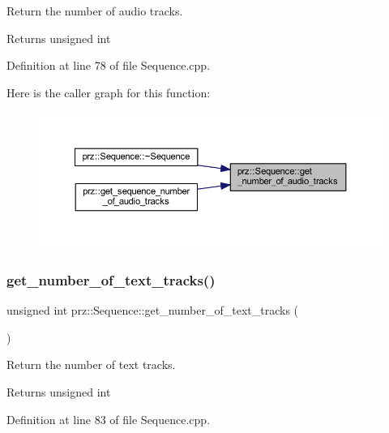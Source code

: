Return the number of audio tracks. 

\begin{DoxyReturn}{Returns}
unsigned int 
\end{DoxyReturn}


Definition at line 78 of file Sequence.\+cpp.

Here is the caller graph for this function\+:
\nopagebreak
\begin{figure}[H]
\begin{center}
\leavevmode
\includegraphics[width=350pt]{classprz_1_1_sequence_a2d0ac9ea8804465100b36bb36a687799_icgraph}
\end{center}
\end{figure}
\mbox{\label{classprz_1_1_sequence_a1f00232c23dda0a52686d2012b6990c5}} 
\subsubsection{\texorpdfstring{get\_number\_of\_text\_tracks()}{get\_number\_of\_text\_tracks()}}
{\footnotesize\ttfamily unsigned int prz\+::\+Sequence\+::get\+\_\+number\+\_\+of\+\_\+text\+\_\+tracks (\begin{DoxyParamCaption}{ }\end{DoxyParamCaption})}



Return the number of text tracks. 

\begin{DoxyReturn}{Returns}
unsigned int 
\end{DoxyReturn}


Definition at line 83 of file Sequence.\+cpp.

